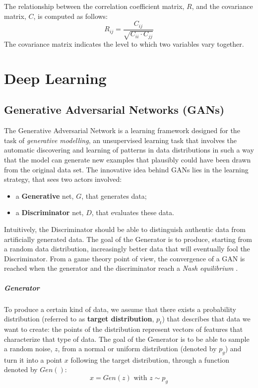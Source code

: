 \documentclass[12pt,a4paper]{book}
\theoremstyle{definition}
\begin{document}
	The relationship between the correlation coefficient matrix, $R$, and the covariance matrix, $C$, is computed as follows:
	\[
	R_{ij} = \frac{C_{ij}}{\sqrt{C_{ii} \cdot C_{jj}}}
	\]
	The covariance matrix indicates the level to which two variables vary together.
	
	\chapter{Deep Learning}\label{appendix:dl}
	\section{Generative Adversarial Networks (GANs)}
	The Generative Adversarial Network \cite{Goodfellow2014} is a learning framework designed for the task of \textit{generative modelling}, an unsupervised learning task that involves the automatic discovering and learning of patterns in data distributions in such a way that the model can generate new examples that plausibly could have been drawn from the original data set. The innovative idea behind GANs lies in the learning strategy, that sees two actors involved:
	\begin{itemize}
		\item a \textbf{Generative} net, $G$, that generates data;
		\item a \textbf{Discriminator} net, $D$, that evaluates these data.
	\end{itemize}
	Intuitively, the Discriminator should be able to distinguish authentic data from artificially generated data. The goal of the Generator is to produce, starting from a random data distribution, increasingly better data that will eventually fool the Discriminator. From a game theory point of view, the convergence of a GAN is reached when the generator and the discriminator reach a \textit{Nash equilibrium} \cite{Ratliff2013}.
	\paragraph{Generator}
	To produce a certain kind of data, we assume that there exists a probability distribution (referred to as \textbf{target distribution}, $p_t$) that describes that data we want to create: the points of the distribution represent vectors of features that characterize that type of data. The goal of the Generator is to be able to sample a random noise, $z$, from a normal or uniform distribution (denoted by $p_g$) and turn it into a point $x$  following the target distribution, through a function denoted by $Gen()$:
	\[
	x = Gen(z) \text{ with } z \sim p_g
	\]
	
\end{document}
